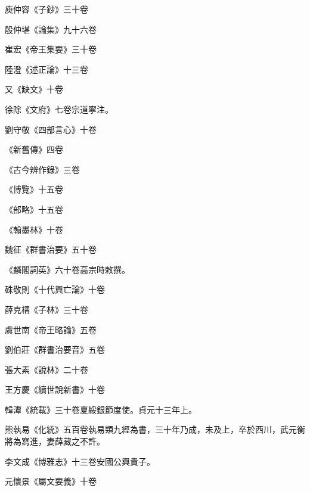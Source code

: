 \begin{pinyinscope}
 庾仲容《子鈔》三十卷



 殷仲堪《論集》九十六卷



 崔宏《帝王集要》三十卷



 陸澄《述正論》十三卷



 又《缺文》十卷



 徐除《文府》七卷宗道寧注。



 劉守敬《四部言心》十卷



 《新舊傳》四卷



 《古今辨作錄》三卷



 《博覽》十五卷



 《部略》十五卷



 《翰墨林》十卷



 魏征《群書治要》五十卷



 《麟閣詞英》六十卷高宗時敕撰。



 硃敬則《十代興亡論》十卷



 薛克構《子林》三十卷



 虞世南《帝王略論》五卷



 劉伯莊《群書治要音》五卷



 張大素《說林》二十卷



 王方慶《續世說新書》十卷



 韓潭《統載》三十卷夏綏銀節度使。貞元十三年上。



 熊執易《化統》五百卷執易類九經為書，三十年乃成，未及上，卒於西川，武元衡將為寫進，妻薛藏之不許。



 李文成《博雅志》十三卷安國公興貴子。



 元懷景《屬文要義》十卷




\end{pinyinscope}
